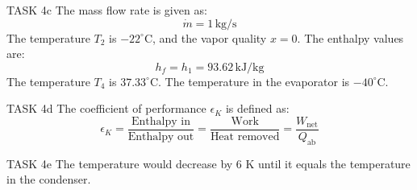 TASK 4c  
The mass flow rate is given as:  
\[
\dot{m} = 1 \, \text{kg/s}
\]  
The temperature \( T_2 \) is \( -22^\circ\text{C} \), and the vapor quality \( x = 0 \).  
The enthalpy values are:  
\[
h_f = h_1 = 93.62 \, \text{kJ/kg}
\]  
The temperature \( T_4 \) is \( 37.33^\circ\text{C} \).  
The temperature in the evaporator is \( -40^\circ\text{C} \).  

TASK 4d  
The coefficient of performance \( \epsilon_K \) is defined as:  
\[
\epsilon_K = \frac{\text{Enthalpy in}}{\text{Enthalpy out}} = \frac{\text{Work}}{\text{Heat removed}} = \frac{W_{\text{net}}}{Q_{\text{ab}}}
\]  

TASK 4e  
The temperature would decrease by 6 K until it equals the temperature in the condenser.